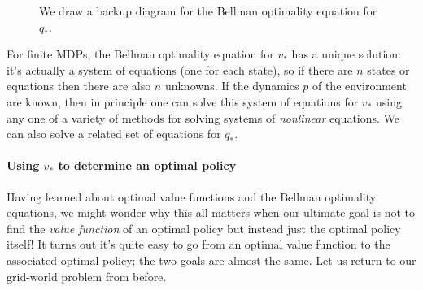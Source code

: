 \documentclass[12pt]{article}
\begin{document}
\begin{figure}[h]
  \centering
  \caption{\footnotesize We draw a backup diagram for the Bellman optimality equation for $q_*$.}
\end{figure}

For finite MDPs, the Bellman optimality equation for $v_*$ has a unique solution: it's actually a system of equations (one for each state), so if there are $n$ states or equations then there are also $n$ unknowns. If the dynamics $p$ of the environment are known, then in principle one can solve this system of equations for $v_*$ using any one of a variety of methods for solving systems of \emph{nonlinear} equations. We can also solve a related set of equations for $q_*$.

\paragraph{Using $v_*$ to determine an optimal policy}
Having learned about optimal value functions and the Bellman optimality equations, we might wonder why this all matters when our ultimate goal is not to find the \emph{value function} of an optimal policy but instead just the optimal policy itself! It turns out it's quite easy to go from an optimal value function to the associated optimal policy; the two goals are almost the same.
Let us return to our grid-world problem from before.
\end{document}
